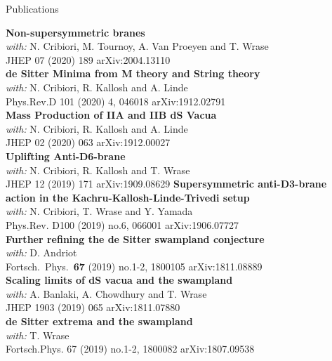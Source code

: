 \documentclass[a4paper]{resume} %
\begin{document}

\begin{rSection}{Publications}

{\bf Non-supersymmetric branes}
\\\emph{with:} N. Cribiori, M. Tournoy, A. Van Proeyen and T. Wrase
 \\ JHEP 07 (2020) 189 \hfill arXiv:2004.13110\vspace{7pt}
\\{\bf de Sitter Minima from M theory and String theory}
\\\emph{with:} N. Cribiori, R. Kallosh and A. Linde
 \\ Phys.Rev.D 101 (2020) 4, 046018 \hfill arXiv:1912.02791\vspace{7pt}
\\{\bf Mass Production of IIA and IIB dS Vacua}
\\\emph{with:} N. Cribiori, R. Kallosh and A. Linde
 \\ JHEP 02 (2020) 063 \hfill arXiv:1912.00027\vspace{7pt}
\\{\bf Uplifting Anti-D6-brane}
\\\emph{with:} N. Cribiori, R. Kallosh and T. Wrase
 \\ JHEP 12 (2019) 171 \hfill arXiv:1909.08629\vspace{7pt}
 \newpage
 {\bf Supersymmetric anti-D3-brane action in the Kachru-Kallosh-Linde-Trivedi setup}
\\\emph{with:} N. Cribiori, T. Wrase and Y. Yamada
\\Phys.Rev. D100 (2019) no.6, 066001 \hfill arXiv:1906.07727\vspace{7pt}
\\{\bf Further refining the de Sitter swampland conjecture}
\\\emph{with:} D. Andriot 
\\Fortsch.\ Phys.\  {\bf 67} (2019) no.1-2,  1800105 \hfill arXiv:1811.08889\vspace{7pt}
\\{\bf Scaling limits of dS vacua and the swampland}
\\\emph{with:} A. Banlaki, A. Chowdhury and T. Wrase
\\JHEP 1903 (2019) 065 \hfill arXiv:1811.07880\vspace{7pt}
\\{\bf de Sitter extrema and the swampland}
\\\emph{with:} T. Wrase
\\Fortsch.Phys. 67 (2019) no.1-2, 1800082 \hfill arXiv:1807.09538

\end{rSection}
\end{document}
